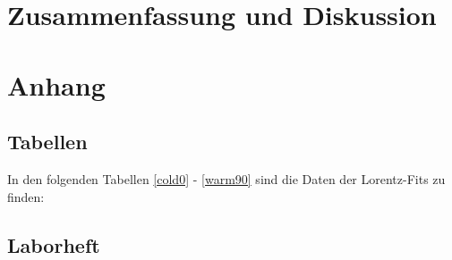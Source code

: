 \documentclass[12pt]{article}
\begin{document}
\clearpage
\section{Zusammenfassung und Diskussion}
\label{diskussion}

\newpage
\section{Anhang}



\subsection{Tabellen}
In den folgenden Tabellen \ref{cold0} - \ref{warm90} sind die Daten der Lorentz-Fits zu finden:







%


%
\clearpage

\subsection{Laborheft}

\newpage
\listoffigures

\end{document}
